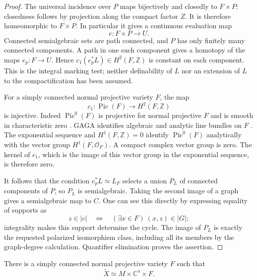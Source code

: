 \begin{proof}
The universal incidence over $P$ maps bijectively and closedly to
$F\times P$: closedness follows by projection along the compact
factor $Z$.  It is therefore homeomorphic to $F\times P$.  In
particular it gives a continuous evaluation map
\[
                         e:F\times P\longrightarrow U.
\]
Connected semialgebraic sets are path connected, and $P$ has only
finitely many connected components.  A path in one such component
gives a homotopy of the maps $e_p:F\to U$.  Hence
$c_1(e_p^*L)\in H^2(F,\mathbb Z)$ is constant on each component.
This is the integral marking test; neither definability of $L$ nor
an extension of $L$ to the compactification has been assumed.

For a simply connected normal projective variety $F$, the map
\[
             c_1:\operatorname{Pic}(F)\longrightarrow H^2(F,\mathbb Z)
\]
is injective.  Indeed $\operatorname{Pic}^0(F)$ is projective for
normal projective $F$ and is smooth in characteristic zero
\cite[Theorem~5.4 and Remark~5.6]{Kleiman2005}.  GAGA identifies algebraic and analytic line bundles on $F$
\cite[Proposition~18]{Serre1956}. The exponential
sequence and $H^1(F,\mathbb Z)=0$ identify $\operatorname{Pic}^0(F)$ analytically
with the vector group $H^1(F,\mathcal O_F)$.  A compact complex vector
group is zero.  The kernel of $c_1$, which is the image of this
vector group in the exponential sequence, is therefore zero.

It follows that the condition $e_p^*L\simeq L_F$ selects a union
$P_L$ of connected components of $P$, so $P_L$ is semialgebraic.
Taking the second image of a graph gives a semialgebraic map to $C$.
One can see this directly by expressing equality of supports as
\[
 z\in|c|\quad\Longleftrightarrow\quad
              (\exists x\in F)\ (x,z)\in|G|;
\]
integrality makes this support determine the cycle.  The image of
$P_L$ is exactly the requested polarized isomorphism class, including
all its members by the graph-degree calculation.  Quantifier
elimination proves the assertion.
\end{proof}

\begin{proposition}
\label{cmp:product}
There is a simply connected normal projective variety $F$ such that
\[
                    \widetilde X\simeq M\times\mathbb C^a\times F.
\]
\end{proposition}

